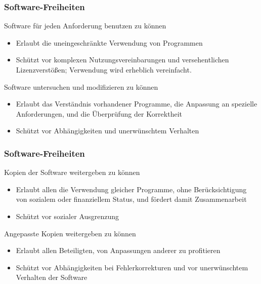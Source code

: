 \documentclass{beamer}
\begin{document}
\begin{frame}
  \frametitle{Software-Freiheiten}

  \onslide<+->
  \onslide<+->

  \begin{block}{Software für jeden Anforderung benutzen zu können}
    \begin{itemize}
    \item Erlaubt die uneingeschränkte Verwendung von Programmen
    \item Schützt vor komplexen Nutzungsvereinbarungen und versehentlichen
      Lizenzverstößen; Verwendung wird erheblich vereinfacht.
    \end{itemize}
  \end{block}

  \onslide<+->

  \begin{block}{Software untersuchen und modifizieren zu können}
    \begin{itemize}
    \item Erlaubt das Verständnis vorhandener Programme, die Anpassung an
      spezielle Anforderungen, und die Überprüfung der Korrektheit
    \item Schützt vor Abhängigkeiten und unerwünschtem Verhalten
    \end{itemize}
  \end{block}

\end{frame}

\begin{frame}
  \frametitle{Software-Freiheiten}

  \onslide<+->

  \begin{block}{Kopien der Software weitergeben zu können}
    \begin{itemize}
    \item Erlaubt allen die Verwendung gleicher Programme, ohne Berücksichtigung
      von sozialem oder finanziellem Status, und fördert damit Zusammenarbeit
    \item Schützt vor sozialer Ausgrenzung
    \end{itemize}
  \end{block}

  \onslide<+->

  \begin{block}{Angepasste Kopien weitergeben zu können}
    \begin{itemize}
    \item Erlaubt allen Beteiligten, von Anpassungen anderer zu profitieren
    \item Schützt vor Abhängigkeiten bei Fehlerkorrekturen und vor unerwünschtem
      Verhalten der Software
    \end{itemize}
  \end{block}
\end{frame}
\end{document}

